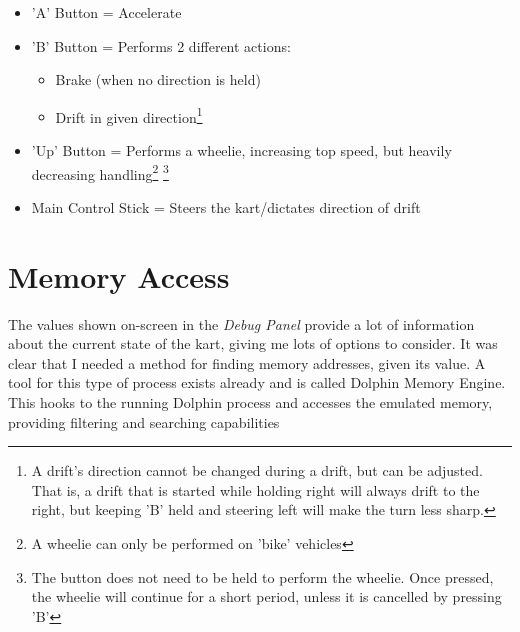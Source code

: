 \begin{itemize}
    \item 'A' Button = Accelerate
    \item 'B' Button = Performs 2 different actions:\begin{itemize}
        \item Brake (when no direction is held)
        \item Drift in given direction\footnote{A drift's direction cannot be changed during a drift, but can be adjusted. That is, a drift that is started while holding right will always drift to the right, but keeping 'B' held and steering left will make the turn less sharp.}
    \end{itemize}
    \item 'Up' Button = Performs a wheelie, increasing top speed, but heavily decreasing handling\footnote{A wheelie can only be performed on 'bike' vehicles} \footnote{The button does not need to be held to perform the wheelie. Once pressed, the wheelie will continue for a short period, unless it is cancelled by pressing 'B'}
    \item Main Control Stick = Steers the kart/dictates direction of drift
\end{itemize}
\section{Memory Access}
The values shown on-screen in the \textit{Debug Panel} provide a lot of information about the current state of the kart, giving me lots of options to consider. It was clear that I needed a method for finding memory addresses, given its value. A tool for this type of process exists already and is called Dolphin Memory Engine\cite{DolphinMemoryEngine}. This hooks to the running Dolphin process and accesses the emulated memory, providing filtering and searching capabilities
